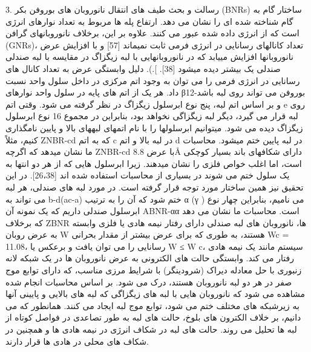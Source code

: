 3. رسالت و بحث طیف های انتقال نانوروبان های بوروفن بکر (BNRs) ساختار گام به گام شناخته شده ای را نشان می دهد. ارتفاع پله ها مربوط به تعداد نوارهای انرژی است که از انرژی داده شده عبور می کنند. علاوه بر این، برخلاف نانوروبانهای گرافن (GNRs)، تعداد کانالهای رسانایی در انرژی فرمی ثابت نمیماند [57] و با افزایش عرض نانوروبانها افزایش مییابد که در نانوروبانهایی با لبه زیگزاگ در مقایسه با لبه صندلی صندلی یک بیشتر دیده میشود [38]. ].). دلیل وابستگی عرض به تعداد کانال های رسانایی در انرژی فرمی را می توان به وجود اتم مرکزی در داخل سلول واحد نسبت داد. هر یک از اتم های پایه در سلول واحد نوارهای β12-بوروفن می تواند روی لبه باشد و بر اساس اتم لبه، پنج نوع ابرسلول زیگزاگ در نظر گرفته می شود. وقتی اتم e روی لبه قرار می گیرد، دیگر لبه زیگزاگی نخواهد بود، بنابراین در مجموع 16 نوع ابرسلول زیگزاگ دیده می شود. میتوانیم ابرسلولها را با نام اتمهای لبههای بالا و پایین نامگذاری کنیم، مثلاً ZNBR-cd که به اتم c در لبه بالا و اتم d در لبه پایین ختم میشود. محاسبات ما نشان میدهد که اگرچه ZNBR-cd با عرض 8.8Å دارای شکافهای باند بسیار کوچکی است، اما اغلب خواص فلزی را نشان میدهند. زیرا ابرسلول هایی که از هر دو انتها به یک سلول ختم می شوند در بسیاری از محاسبات استفاده شده اند [26،38]. در این تحقیق نیز همین ساختار مورد توجه قرار گرفته است. در مورد لبه های صندلی، هر لبه می تواند به b-d(ac-a) ختم شود که آن را به ترتیب α (γ ) می نامیم، بنابراین چهار نوع ابرسلول صندلی داریم که یک نمونه آن ABNR-αα است. محاسبات ما نشان می دهد که برخلاف ZBNR ها، نانوروبان های لبه صندلی دارای رفتار نیمه هادی یا فلزی وابسته به عرض روبان W هستند، به طوری که برای عرض بیشتر از مقدار بحرانی Wc = 11.08، رسانایی را می توان یافت و برعکس یا W ≤ W c، سیستم مانند یک نیمه هادی رفتار می کند. وابستگی حالت های الکترونی به عرض نانوروبان ها در یک شبکه لانه زنبوری با حل معادله دیراک (شرودینگر) با شرایط مرزی مناسب، که دارای توابع موج صفر در هر دو لبه نانوروبان هستند، درک می شود. بر اساس محاسبات انجام شده مشاهده می شود که نانوروبان هایی با لبه های زیگزاگی که لبه های بالایی و پایینی آنها به زیرشبکه های مختلف ختم می شود، توابع موج لبه ایجاد می کنند. همانطور که می دانیم، بر خلاف الکترون های بلوخ، حالت های لبه به طور تصاعدی در فواصل کوتاه از لبه ها تحلیل می روند. حالت های لبه در شکاف انرژی در نیمه هادی ها و همچنین در شکاف های محلی در هادی ها قرار دارند.
